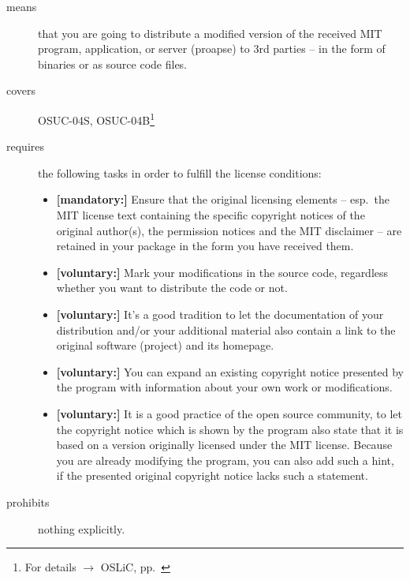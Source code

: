 \begin{description}
\item[means] that you are going to distribute a modified version of the received
MIT program, application, or server (proapse) to 3rd parties --  in the form of
binaries or as source code files.
\item[covers] OSUC-04S, OSUC-04B\footnote{For details $\rightarrow$ OSLiC, pp.\
\pageref{OSUC-04S-DEF}}
\item[requires] the following tasks in order to fulfill the license conditions:
\begin{itemize}
  \item \textbf{[mandatory:]} Ensure that the original licensing elements -- esp.\
  the MIT license text containing the specific copyright notices of the original
  author(s), the permission notices and the MIT disclaimer -- are retained in
  your package in the form you have received them.
  \item \textbf{[voluntary:]} Mark your modifications in the source code,
  regardless whether you want to distribute the code or not.
  \item \textbf{[voluntary:]} It's a good tradition to let the documentation of
  your distribution and/or your additional material also contain a link to the
  original software (project) and its homepage.
  \item \textbf{[voluntary:]} You can expand an existing copyright notice
  presented by the program with information about your own work or
  modifications.
  \item \textbf{[voluntary:]} It is a good practice of the open source
  community, to let the copyright notice which is shown by the program also
  state that it is based on a version originally licensed under the MIT license.
  Because you are already modifying the program, you can also add such a hint,
  if the presented original copyright notice lacks such a statement.
\end{itemize}
\item[prohibits] nothing explicitly.
\end{description}

